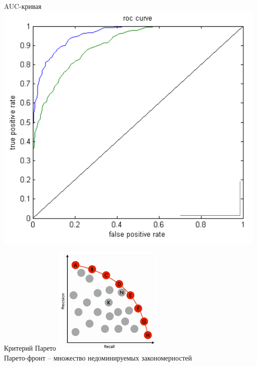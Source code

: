 \documentclass[10pt]{beamer}
\begin{document}
{
\begin{frame}{AUC-кривая}
  \centering
  \includegraphics[height=0.7 \textheight, keepaspectratio = true]{images/auc}   \\  
\end{frame}
}

\begin{frame}{Критерий Парето}
  \centering
  \includegraphics[height=150pt, keepaspectratio = true]{images/pareto}   \\
  Парето-фронт -- множество недоминируемых закономерностей
\end{frame}
\end{document}
